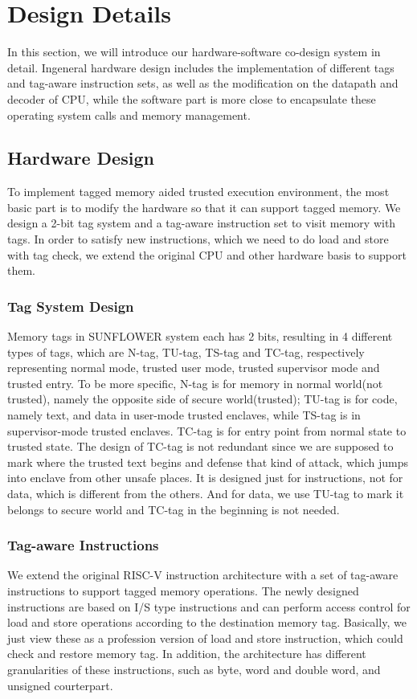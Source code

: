 \documentclass[conference]{IEEEtran}
\begin{document}
\section{Design Details}
In this section, we will introduce our hardware-software co-design system in detail. Ingeneral hardware design includes the implementation of different tags and tag-aware instruction sets, as well as the modification on the datapath and decoder of CPU, while the software part is more close to encapsulate these operating system calls and memory management. 

\subsection{Hardware Design}
To implement tagged memory aided trusted execution environment, the most basic part is to modify the hardware so that it can support tagged memory. We design a 2-bit tag system and a tag-aware instruction set to visit memory with tags. In order to satisfy new instructions, which we need to do load and store with tag check, we extend the original CPU and other hardware basis to support them. 

\subsubsection{Tag System Design}
Memory tags in SUNFLOWER system each has 2 bits, resulting in 4 different types of tags, which are N-tag, TU-tag, TS-tag and TC-tag, respectively representing normal mode, trusted user mode, trusted supervisor mode and trusted entry. To be more specific, N-tag is for memory in normal world(not trusted), namely the opposite side of secure world(trusted); TU-tag is for code, namely text, and data in user-mode trusted enclaves, while TS-tag is in supervisor-mode trusted enclaves. TC-tag is for entry point from normal state to trusted state. The design of TC-tag is not redundant since we are supposed to mark where the trusted text begins and defense that kind of attack, which jumps into enclave from other unsafe places. It is designed just for instructions, not for data, which is different from the others. And for data, we use TU-tag to mark it belongs to secure world and TC-tag in the beginning is not needed.

\subsubsection{Tag-aware Instructions}
We extend the original RISC-V instruction architecture with a set of tag-aware instructions to support tagged memory operations. The newly designed instructions are based on I/S type instructions and can perform access control for load and store operations according to the destination memory tag. Basically, we just view these as a profession version of load and store instruction, which could check and restore memory tag. In addition, the architecture has different granularities of these instructions, such as byte, word and double word, and unsigned courterpart.
\end{document}
